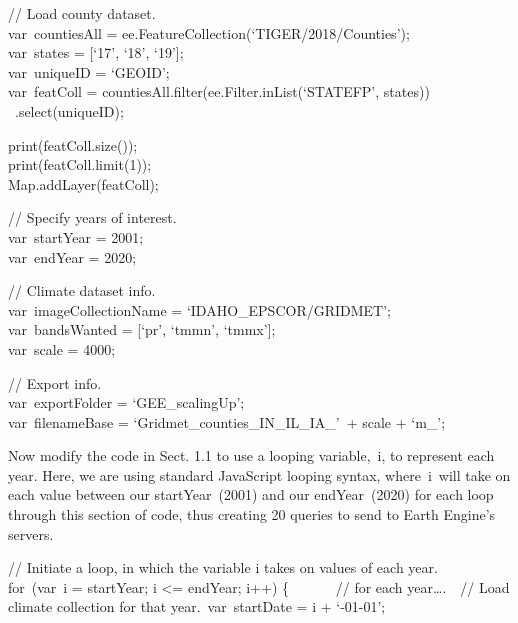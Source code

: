 \documentclass[
  letterpaper,
  DIV=11,
  numbers=noendperiod]{scrreprt}
\begin{document}
// Load county dataset.\\
var~countiesAll = ee.FeatureCollection(`TIGER/2018/Counties');\\
var~states = {[}`17', `18', `19'{]};\\
var~uniqueID = `GEOID';\\
var~featColl = countiesAll.filter(ee.Filter.inList(`STATEFP', states))\\
\hspace*{0.333em} ~.select(uniqueID);

print(featColl.size());\\
print(featColl.limit(1));\\
Map.addLayer(featColl);

// Specify years of interest.\\
var~startYear = 2001;\\
var~endYear = 2020;

// Climate dataset info.\\
var~imageCollectionName = `IDAHO\_EPSCOR/GRIDMET';\\
var~bandsWanted = {[}`pr', `tmmn', `tmmx'{]};\\
var~scale = 4000;

// Export info.\\
var~exportFolder = `GEE\_scalingUp';\\
var~filenameBase = `Gridmet\_counties\_IN\_IL\_IA\_'~+ scale + `m\_';

Now modify the code in Sect. 1.1 to use a looping variable,~i, to
represent each year. Here, we are using standard JavaScript looping
syntax, where~i~will take on each value between our startYear~(2001) and
our endYear~(2020) for each loop through this section of code, thus
creating 20 queries to send to Earth Engine's servers.

// Initiate a loop, in which the variable i takes on values of each
year.\\
for~(var~i = startYear; i \textless= endYear; i++) \{ ~ ~ ~ ~// for each
year\ldots.~~// Load climate collection for that year.~var~startDate = i
+ `-01-01';
\end{document}
